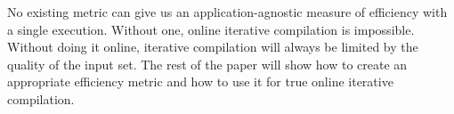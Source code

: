     No existing metric can give us an application-agnostic measure of efficiency with a single execution. Without one, online iterative
    compilation is impossible. Without doing it online, iterative compilation will always be limited by the quality of the input set.
    The rest of the paper will show how to create an appropriate efficiency metric and how to use it for true online iterative
    compilation.

